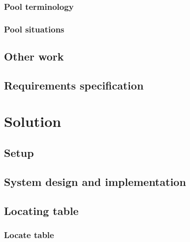 		\subsection{Pool terminology}
			\label{sec:terminology}
			
	
		\subsection{Pool situations}
			\label{sec:situations}
			
	
		
	\section{Other work}
		\label{sec:otherwork}
		
					
	\section{Requirements specification}
		\label{sec:reqspec}
		

\chapter{Solution}
	\label{solution}
	
	
	\section{Setup}
		\label{sec:setup}
		

	\section{System design and implementation}
		\label{sec:sysdesign}
		
		
	\section{Locating table}
		\label{sec:table-intro}	
			
		
			\subsection{Locate table}
				\label{sec:table-locate}
				
		
		
